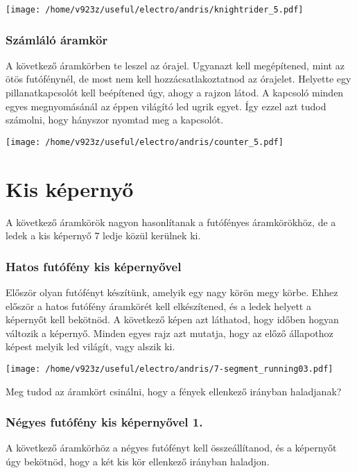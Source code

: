\documentclass[16pt]{scrreprt}
\begin{document}
\texttt{[image: /home/v923z/useful/electro/andris/knightrider\_5.pdf]}

\subsubsection{Számláló áramkör}

A következő áramkörben te leszel az órajel. Ugyanazt kell megépítened, mint az ötös futófénynél, de most nem kell
hozzá\-csatlakoztatnod az órajelet. Helyette egy pillanatkapcsolót kell beépítened úgy, ahogy a rajzon látod. A kapcsoló
minden egyes megnyomásánál az éppen világító led ugrik egyet. Így ezzel azt tudod számolni, hogy hányszor nyomtad meg a
kapcsolót.

\texttt{[image: /home/v923z/useful/electro/andris/counter\_5.pdf]}

\section{Kis képernyő}

A következő áramkörök nagyon hasonlítanak a futófényes áramkörökhöz, de a ledek a kis képernyő 7 ledje közül kerülnek 
ki. 

\subsubsection{Hatos futófény kis képernyővel}

Először olyan futófényt készítünk, amelyik egy nagy körön megy körbe. Ehhez először a hatos futófény áramkörét kell 
elkészítened, és a ledek helyett a képernyőt kell bekötnöd. A következő képen azt láthatod, hogy időben hogyan változik 
a képernyő. Minden egyes rajz azt mutatja, hogy az előző állapothoz képest melyik led világít, vagy alszik ki. 

\texttt{[image: /home/v923z/useful/electro/andris/7-segment\_running03.pdf]}

Meg tudod az áramkört csinálni, hogy a fények ellenkező irányban haladjanak?

\subsubsection{Négyes futófény kis képernyővel 1.}

A következő áramkörhöz a négyes futófényt kell összeállítanod, és a képernyőt úgy bekötnöd, hogy a két kis kör 
ellenkező irányban haladjon. 
\end{document}
